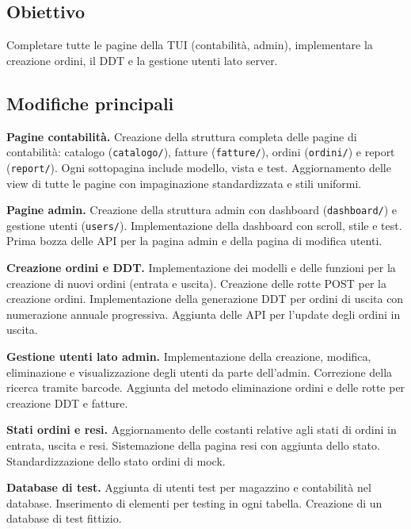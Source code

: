 \documentclass[a4paper,12pt]{article}
\begin{document}
\subsection*{Obiettivo}
Completare tutte le pagine della TUI (contabilit\`{a}, admin), implementare la creazione ordini, il DDT e la gestione utenti lato server.

\subsection*{Modifiche principali}

\textbf{Pagine contabilit\`{a.}}
Creazione della struttura completa delle pagine di contabilit\`{a}: catalogo (\texttt{catalogo/}), fatture (\texttt{fatture/}), ordini (\texttt{ordini/}) e report (\texttt{report/}). Ogni sottopagina include modello, vista e test. Aggiornamento delle view di tutte le pagine con impaginazione standardizzata e stili uniformi.

\textbf{Pagine admin.}
Creazione della struttura admin con dashboard (\texttt{dashboard/}) e gestione utenti (\texttt{users/}). Implementazione della dashboard con scroll, stile e test. Prima bozza delle API per la pagina admin e della pagina di modifica utenti.

\textbf{Creazione ordini e DDT.}
Implementazione dei modelli e delle funzioni per la creazione di nuovi ordini (entrata e uscita). Creazione delle rotte POST per la creazione ordini. Implementazione della generazione DDT per ordini di uscita con numerazione annuale progressiva. Aggiunta delle API per l'update degli ordini in uscita.

\textbf{Gestione utenti lato admin.}
Implementazione della creazione, modifica, eliminazione e visualizzazione degli utenti da parte dell'admin. Correzione della ricerca tramite barcode. Aggiunta del metodo eliminazione ordini e delle rotte per creazione DDT e fatture.

\textbf{Stati ordini e resi.}
Aggiornamento delle costanti relative agli stati di ordini in entrata, uscita e resi. Sistemazione della pagina resi con aggiunta dello stato. Standardizzazione dello stato ordini di mock.

\textbf{Database di test.}
Aggiunta di utenti test per magazzino e contabilit\`{a} nel database. Inserimento di elementi per testing in ogni tabella. Creazione di un database di test fittizio.
\end{document}
